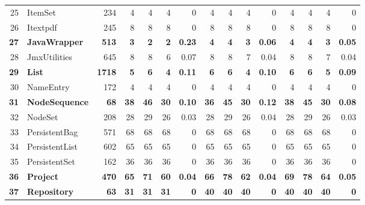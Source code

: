 \documentclass[conference]{IEEEtran}
\begin{document}
\begin{table} [htp!]
{\begin{tabularx}{0.91 \textwidth}{|r|l|r|r|r|r|r|r|r|r|r|r|r|r|r|}
25						& ItemSet					&234		& 4		&	4	&	4	& 	0					& 4		& 4 		& 4		& 		0			& 4			& 4			& 4			&	0	\\       
26						& Itextpdf					&245		& 8		&	8	&	8	& 	0					& 8		&  8		& 8		& 		0			& 8			& 8			& 8			&	0\\      
\textbf{27}						& \textbf{JavaWrapper}				&\textbf{513}		&\textbf{3}		&	\textbf{2}	&	\textbf{2}	& 	\textbf{0.23}					& \textbf{4}		& \textbf{4} 		& \textbf{3}		& 		\textbf{0.06}			& \textbf{4}			& \textbf{4}			& \textbf{3}			&	\textbf{0.05}\\      
28						& JmxUtilities				&645		& 8		&	8	&	6	& 	0.07					& 8		& 8 		& 7		& 		0.04			& 8			& 8			& 7			&	0.04\\      
\textbf{29}						& \textbf{List}					&\textbf{1718}		& \textbf{5}		&	\textbf{6}	&	\textbf{4}	& 	\textbf{0.11}					& \textbf{6}		& \textbf{6} 		& \textbf{4}		& 		\textbf{0.10}			&\textbf{6}			& \textbf{6}			& \textbf{5}			&	\textbf{0.09}\\      
30						& NameEntry				&172		& 4		&	4	&	4	& 	0					& 4		& 4 		& 4		& 		0			& 4			& 4			& 4			&	0	\\  
\textbf{31}						& \textbf{NodeSequence}			&\textbf{68}			& \textbf{38}		&	\textbf{46}	&	\textbf{30}	& 	\textbf{0.10}					& \textbf{36}		& \textbf{45} 		& \textbf{30}		& 		\textbf{0.12}			& \textbf{38}			& \textbf{45}			& \textbf{30}			&	\textbf{0.08}	\\     
32						& NodeSet				&208		& 28		&	29	&	26	& 	0.03					& 28		& 29 		& 26		& 		0.04			& 28			& 29			& 26			&	0.03	\\  
33						& PersistentBag			&571		& 68		&	68	&	68	& 	0					& 68		&  68		& 68		& 		0			& 68			& 68			& 68			&	0	\\         
34						& PersistentList				&602		& 65		&	65	&	65	& 	0					& 65		&  65		& 65		& 		0			& 65			& 65			& 65			&	0	\\    
35						& PersistentSet				&162		& 36		&	36	&	36	& 	0					& 36		&  36		& 36		& 		0			& 36			& 36			& 36 			&	0	\\        
\textbf{36}						& \textbf{Project}					&\textbf{470}		& \textbf{65}		&	\textbf{71}	&	\textbf{60}	& 	\textbf{0.04}					& \textbf{66}		&  \textbf{78}		& \textbf{62}		& 		\textbf{0.04}			& \textbf{69}			& \textbf{78}			& \textbf{64}			&	\textbf{0.05}	\\        
\textbf{37}						& \textbf{Repository}				&\textbf{63}			& \textbf{31}		&	\textbf{31}	&	\textbf{31}	& 	\textbf{0}					& \textbf{40}		&  \textbf{40}		& \textbf{40}		& 		\textbf{0}			& \textbf{40}			& \textbf{40}			& \textbf{40}			&	\textbf{0}	\\         

\end{tabularx}}
\end{table}
\end{document}
